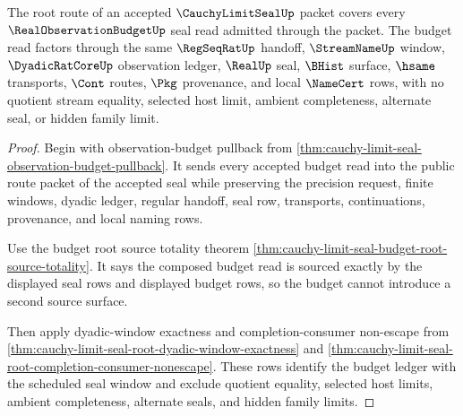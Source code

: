 \begin{theorem}
\label{thm:cauchy-limit-seal-root-budget-seal-coverage}
The root route of an accepted $\CauchyLimitSealUp$ packet covers every $\RealObservationBudgetUp$ seal read admitted through the packet. The budget read factors through the same $\RegSeqRatUp$ handoff, $\StreamNameUp$ window, $\DyadicRatCoreUp$ observation ledger, $\RealUp$ seal, $\BHist$ surface, $\hsame$ transports, $\Cont$ routes, $\Pkg$ provenance, and local $\NameCert$ rows, with no quotient stream equality, selected host limit, ambient completeness, alternate seal, or hidden family limit.
\end{theorem}
\begin{proof}
Begin with observation-budget pullback from \autoref{thm:cauchy-limit-seal-observation-budget-pullback}. It sends every accepted budget read into the public route packet of the accepted seal while preserving the precision request, finite windows, dyadic ledger, regular handoff, seal row, transports, continuations, provenance, and local naming rows.

Use the budget root source totality theorem \autoref{thm:cauchy-limit-seal-budget-root-source-totality}. It says the composed budget read is sourced exactly by the displayed seal rows and displayed budget rows, so the budget cannot introduce a second source surface.

Then apply dyadic-window exactness and completion-consumer non-escape from \autoref{thm:cauchy-limit-seal-root-dyadic-window-exactness} and \autoref{thm:cauchy-limit-seal-root-completion-consumer-nonescape}. These rows identify the budget ledger with the scheduled seal window and exclude quotient equality, selected host limits, ambient completeness, alternate seals, and hidden family limits.
\end{proof}

